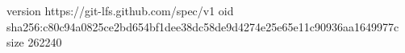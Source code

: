 version https://git-lfs.github.com/spec/v1
oid sha256:c80c94a0825ce2bd654bf1dee38dc58de9d4274e25e65e11c90936aa1649977c
size 262240
